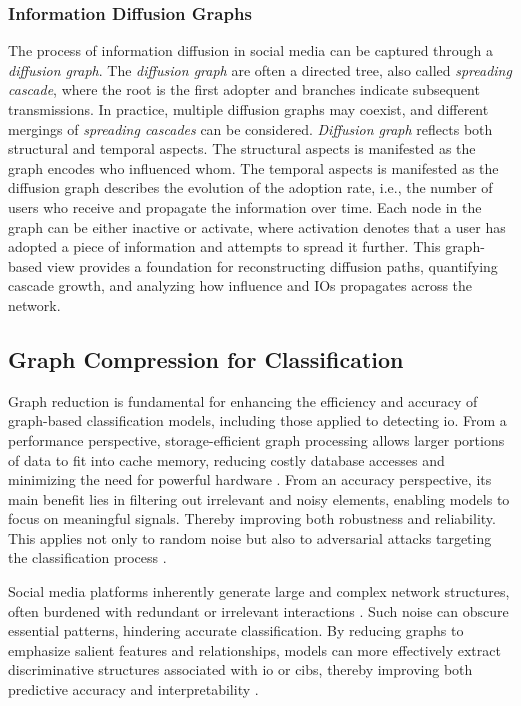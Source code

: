\documentclass{article}
\begin{document}
\subsubsection{Information Diffusion Graphs}  
The process of information diffusion in social media can be captured through a \textit{diffusion graph}. The \textit{diffusion graph} are often a directed tree, also called \textit{spreading cascade}, where the root is the first adopter and branches indicate subsequent transmissions. In practice, multiple diffusion graphs may coexist, and different mergings of \textit{spreading cascades} can be considered. \textit{Diffusion graph} reflects both structural and temporal aspects. The structural aspects is manifested as the graph encodes who influenced whom. The temporal aspects is manifested as the diffusion graph describes the evolution of the adoption rate, i.e., the number of users who receive and propagate the information over time. Each node in the graph can be either inactive or activate, where activation denotes that a user has adopted a piece of information and attempts to spread it further. This graph-based view provides a foundation for reconstructing diffusion paths, quantifying cascade growth, and analyzing how influence and IOs propagates across the network.\cite{information2013diffusion}

\subsection{Graph Compression for Classification}

Graph reduction is fundamental for enhancing the efficiency and accuracy of graph-based classification models, including those applied to detecting \ac{io}. From a performance perspective, storage-efficient graph processing allows larger portions of data to fit into cache memory, reducing costly database accesses and minimizing the need for powerful hardware \cite{graphCompression2018survey}.  
From an accuracy perspective, its main benefit lies in filtering out irrelevant and noisy elements, enabling models to focus on meaningful signals. Thereby improving both robustness and reliability. This applies not only to random noise but also to adversarial attacks targeting the classification process \cite{backbone2022collectiveBehavior, graphClassification2023egc2}.

Social media platforms inherently generate large and complex network structures, often burdened with redundant or irrelevant interactions \cite{efficient2023eventDetection}. Such noise can obscure essential patterns, hindering accurate classification. By reducing graphs to emphasize salient features and relationships, models can more effectively extract discriminative structures associated with \ac{io} or \acp{cib}, thereby improving both predictive accuracy and interpretability \cite{backbone2022collectiveBehavior}.  
\end{document}

